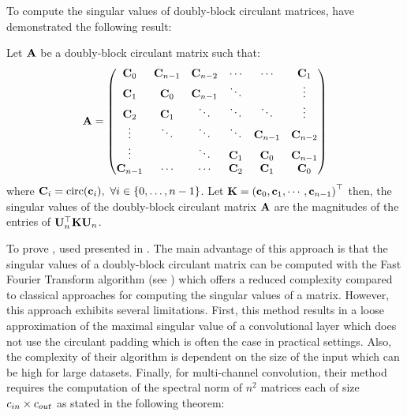 To compute the singular values of doubly-block circulant matrices, \citet{sedghi2018singular} have demonstrated the following result:
\begin{theorem} \label{theorem:ch3-singular_values_doubly_block_circulant}
  Let $\mathbf{A}$ be a doubly-block circulant matrix such that:
  \begin{equation*}
    \mathbf{A} = \begin{pmatrix}
      \mathbf{C}_0     & \mathbf{C}_{n-1} & \mathbf{C}_{n-2} & \cdots  & \cdots      & \mathbf{C}_1     \\
      \mathbf{C}_1     & \mathbf{C}_0     & \mathbf{C}_{n-1} & \ddots  &             & \vdots      \\
      \mathbf{C}_2     & \mathbf{C}_1     & \ddots      & \ddots  & \ddots      & \vdots      \\
      \vdots      & \ddots      & \ddots      & \ddots  & \mathbf{C}_{n-1} & \mathbf{C}_{n-2} \\
      \vdots      &             & \ddots      & \mathbf{C}_1 & \mathbf{C}_{0}   & \mathbf{C}_{n-1} \\
      \mathbf{C}_{n-1} & \cdots      & \cdots      & \mathbf{C}_2 & \mathbf{C}_{1}   & \mathbf{C}_0
    \end{pmatrix}
  \end{equation*}
  where $\mathbf{C}_i = \mathrm{circ}({\mathbf{c}_i}),\ \forall i \in \{0,\dots,n-1\}$.
  Let $\Kmat = \leftmat \cvec_0, \cvec_1, \cdots, \cvec_{n-1} \rightmat^\top$ then, the singular values of the doubly-block circulant matrix $\mathbf{A}$ are the magnitudes of the entries of $\mathbf{U}_n^\top \mathbf{K} \mathbf{U}_n$.
\end{theorem}

\noindent
To prove , \citet{sedghi2018singular} used  presented in .
The main advantage of this approach is that the singular values of a doubly-block circulant matrix can be computed with the Fast Fourier Transform algorithm (see ) which offers a reduced complexity compared to classical approaches for computing the singular values of a matrix. 
However, this approach exhibits several limitations.
First, this method results in a loose approximation of the maximal singular value of a convolutional layer which does not use the circulant padding which is often the case in practical settings.
Also, the complexity of their algorithm is dependent on the size of the input which can be high for large datasets.
Finally, for multi-channel convolution, their method requires the computation of the spectral norm of $n^2$ matrices each of size $c_{in} \times c_{out}$ as stated in the following theorem:

